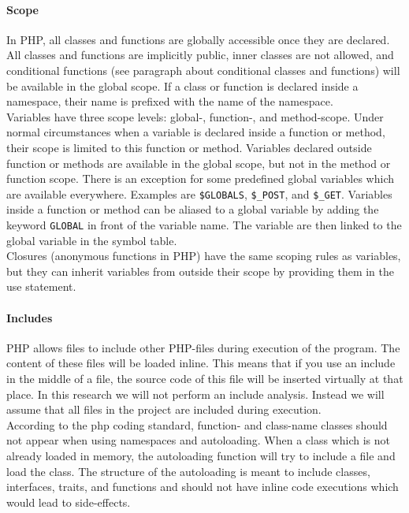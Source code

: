 \documentclass[../main.tex]{subfiles}
\begin{document}
    \paragraph{Scope}
    In PHP, all classes and functions are globally accessible once they are declared.
    All classes and functions are implicitly public, inner classes are not allowed, and conditional functions (see paragraph about conditional classes and functions) will be available in the global scope.
    If a class or function is declared inside a namespace, their name is prefixed with the name of the namespace.
    \\
    Variables have three scope levels: global-, function-, and method-scope.
    Under normal circumstances when a variable is declared inside a function or method, their scope is limited to this function or method.
    Variables declared outside function or methods are available in the global scope, but not in the method or function scope.
    There is an exception for some predefined global variables which are available everywhere. 
    Examples are \texttt{\$GLOBALS}, \texttt{\$\_POST}, and \texttt{\$\_GET}. 
    Variables inside a function or method can be aliased to a global variable by adding the keyword \texttt{GLOBAL} in front of the variable name.
    The variable are then linked to the global variable in the symbol table\footnotemark.
    \\
    Closures (anonymous functions in PHP) have the same scoping rules as variables, but they can inherit variables from outside their scope by providing them in the use statement. 
    
    \paragraph{Includes}
    PHP allows files to include other PHP-files during execution of the program. 
    The content of these files will be loaded inline. 
    This means that if you use an include in the middle of a file, the source code of this file will be inserted virtually at that place.
    In this research we will not perform an include analysis.
    Instead we will assume that all files in the project are included during execution. 
    \\
    According to the php coding standard\footnotemark, function- and class-name classes should not appear when using namespaces and autoloading.
    When a class which is not already loaded in memory, the autoloading function will try to include a file and load the class.
    The structure of the autoloading is meant to include classes, interfaces, traits, and functions and should not have inline code executions which would lead to side-effects.
    
\end{document}
